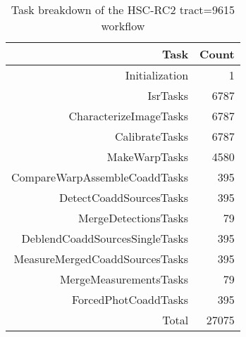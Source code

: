 \begin{table}
\centering
\begin{tabular} {|r|r|}
\hline 
{Task}&{Count}\\ \hline 
Initialization&1\\
IsrTasks&6787\\
CharacterizeImageTasks&6787\\
CalibrateTasks&6787\\
MakeWarpTasks&4580\\
CompareWarpAssembleCoaddTasks&395\\
DetectCoaddSourcesTasks&395\\
MergeDetectionsTasks&79\\
DeblendCoaddSourcesSingleTasks&395\\
MeasureMergedCoaddSourcesTasks&395\\
MergeMeasurementsTasks&79\\
ForcedPhotCoaddTasks&395\\ \hline
Total&27075\\ \hline
\end{tabular}
\caption{Task breakdown of the HSC-RC2 tract=9615 workflow}
\label{tab:taskBreakdown}
\end{table}
